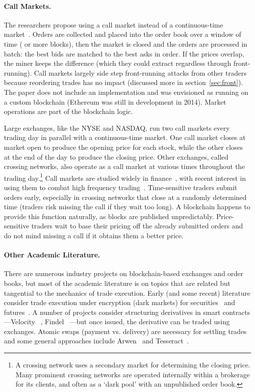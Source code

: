 \paragraph{Call Markets.} The researchers propose using a call market instead of a continuous-time market~\cite{clark2014decentralizing}. Orders are collected and placed into the order book over a window of time ( or more blocks), then the market is closed and the orders are processed in batch: the best bids are matched to the best asks in order. If the prices overlap, the miner keeps the difference (which they could extract regardless through front-running). Call markets largely side step front-running attacks from other traders because reordering trades has no impact (discussed more in section~\ref{sec:front}). The paper does not include an implementation and was envisioned as running on a custom blockchain (Ethereum was still in development in 2014). Market operations are part of the blockchain logic.

Large exchanges, like the NYSE and NASDAQ, run two call markets every trading day in parallel with a continuous-time market. One call market closes at market open to produce the opening price for each stock, while the other closes at the end of the day to produce the closing price. Other exchanges, called crossing networks, also operate as a call market at various times throughout the trading day.\footnote{A crossing network uses a secondary market for determining the closing price. Many prominent crossing networks are operated internally within a brokerage for its clients, and often as a `dark pool' with an unpublished order book.} Call markets are studied widely in finance~\cite{Har03}, with recent interest in using them to combat high frequency trading~\cite{budish2015high,aquilina2020quantifying}. Time-sensitive traders submit orders early, especially in crossing networks that close at a randomly determined time (traders risk missing the call if they wait too long). A blockchain happens to provide this function naturally, as blocks are published unpredictably. Price-sensitive traders wait to base their pricing off the already submitted orders and do not mind missing a call if it obtains them a better price. 

\paragraph{Other Academic Literature.} There are numerous industry projects on blockchain-based exchanges and order books, but most of the academic literature is on topics that are related but tangential to the mechanics of trade execution. Early (and some recent) literature consider trade execution under encryption (\ie dark markets) for securities~\cite{TP07,YSLT10,TW12,cartlidge2019mpc} and futures~\cite{massacci2018futuresmex}. A number of projects consider structuring derivatives in smart contracts---Velocity ~\cite{eskandari2017feasibility}, Findel ~\cite{biryukov2017findel}---but once issued, the derivative can be traded using exchanges. Atomic swaps (\ie payment vs. delivery) are necessary for settling trades and some general approaches include Arwen~\cite{heilman2020arwen} and Tesseract~\cite{bentov2017tesseract}.

